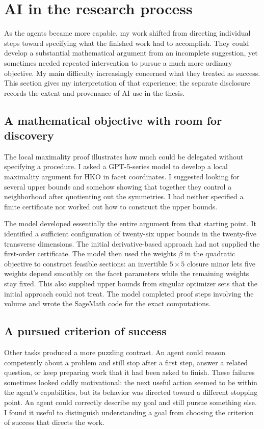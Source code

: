 \clearpage
\section{AI in the research process}
\label{sec:use-of-ai}

As the agents became more capable, my work shifted from directing individual
steps toward specifying what the finished work had to accomplish. They could
develop a substantial mathematical argument from an incomplete suggestion,
yet sometimes needed repeated intervention to pursue a much more ordinary
objective. My main difficulty increasingly concerned what they treated as
success. This section gives my interpretation of that experience; the separate
disclosure records the extent and provenance of AI use in the thesis.

\subsection{A mathematical objective with room for discovery}

The local maximality proof illustrates how much could be delegated without
specifying a procedure. I asked a GPT-5-series model to develop a local
maximality argument for HKO in facet coordinates. I suggested looking for
several upper bounds and somehow showing that together they control a
neighborhood after quotienting out the symmetries. I had neither specified a
finite certificate nor worked out how to construct the upper bounds.

The model developed essentially the entire argument from that starting
point. It identified a sufficient configuration of twenty-six upper bounds
in the twenty-five transverse dimensions. The initial derivative-based
approach had not supplied the first-order certificate. The model then used the weights $\beta$ in the quadratic
objective to construct feasible sections: an invertible $5\times5$ closure
minor lets five weights depend smoothly on the facet parameters while the
remaining weights stay fixed. This also supplied upper bounds from singular
optimizer sets that the initial approach could not treat. The model completed
proof steps involving the volume and wrote the SageMath code for the exact
computations.

\subsection{A pursued criterion of success}

Other tasks produced a more puzzling contrast. An agent could reason
competently about a problem and still stop after a first step, answer a
related question, or keep preparing work that it had been asked to finish.
These failures sometimes looked oddly motivational: the next useful action
seemed to be within the agent's capabilities, but its behavior was directed
toward a different stopping point. An agent could correctly describe my goal
and still pursue something else. I found it useful to distinguish understanding
a goal from choosing the criterion of success that directs the work.

